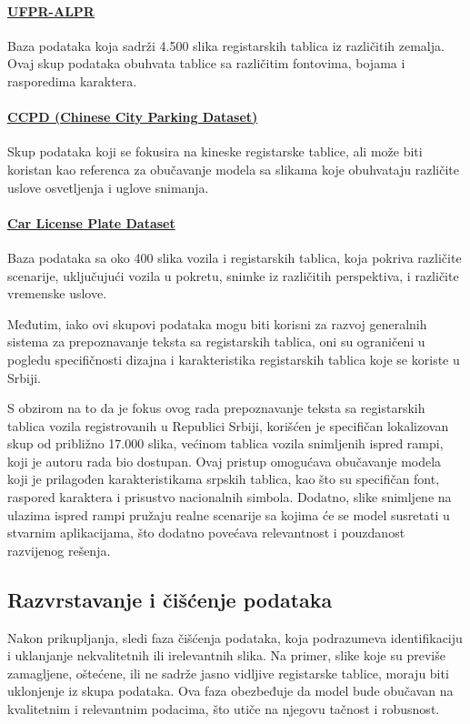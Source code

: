 \documentclass[a4paper,12pt]{article}
\begin{document}
	\paragraph{\href{https://github.com/raysonlaroca/ufpr-alpr-dataset}{UFPR-ALPR}}
	Baza podataka koja sadrži 4.500 slika registarskih tablica iz različitih zemalja. Ovaj skup podataka obuhvata tablice sa različitim fontovima, bojama i rasporedima karaktera.
	
	\paragraph{\href{https://github.com/detectRecog/CCPD}{CCPD (Chinese City Parking Dataset)}}
	Skup podataka koji se fokusira na kineske registarske tablice, ali može biti koristan kao referenca za obučavanje modela sa slikama koje obuhvataju različite uslove osvetljenja i uglove snimanja.
	
	\paragraph{\href{https://datasetninja.com/car-license-plate}{Car License Plate Dataset}}
	Baza podataka sa oko 400 slika vozila i registarskih tablica, koja pokriva različite scenarije, uključujući vozila u pokretu, snimke iz različitih perspektiva, i različite vremenske uslove. \newline
	
	Međutim, iako ovi skupovi podataka mogu biti korisni za razvoj generalnih sistema za prepoznavanje teksta sa registarskih tablica, oni su ograničeni u pogledu specifičnosti dizajna i karakteristika registarskih tablica koje se koriste u Srbiji.
	
	S obzirom na to da je fokus ovog rada prepoznavanje teksta sa registarskih tablica vozila registrovanih u Republici Srbiji, korišćen je specifičan lokalizovan skup od približno 17.000 slika, većinom tablica vozila snimljenih ispred rampi, koji je autoru rada bio dostupan. Ovaj pristup omogućava obučavanje modela koji je prilagođen karakteristikama srpskih tablica, kao što su specifičan font, raspored karaktera i prisustvo nacionalnih simbola. Dodatno, slike snimljene na ulazima ispred rampi pružaju realne scenarije sa kojima će se model susretati u stvarnim aplikacijama, što dodatno povećava relevantnost i pouzdanost razvijenog rešenja.
	
	\subsection{Razvrstavanje i čišćenje podataka}
	Nakon prikupljanja, sledi faza čišćenja podataka, koja podrazumeva identifikaciju i uklanjanje nekvalitetnih ili irelevantnih slika. Na primer, slike koje su previše zamagljene, oštećene, ili ne sadrže jasno vidljive registarske tablice, moraju biti uklonjenje iz skupa podataka. Ova faza obezbeđuje da model bude obučavan na kvalitetnim i relevantnim podacima, što utiče na njegovu tačnost i robusnost.
	
\end{document}
